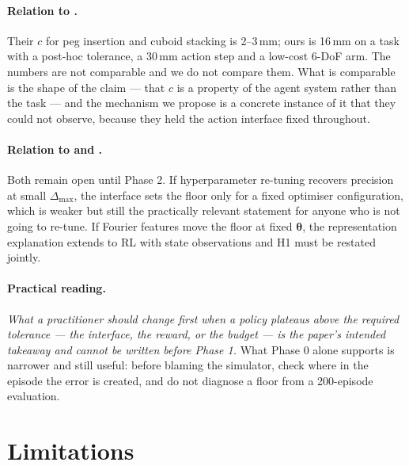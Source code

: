 \documentclass{article}
\newcommand{\planned}[1]{{\color{blue!70!black}\textit{#1}}}
\newcommand{\dmax}{\Delta_{\max}}
\newcommand{\iface}{\boldsymbol{\theta}}
\begin{document}
\paragraph{Relation to \citet{xu2026curse}.} Their $c$ for peg insertion and
cuboid stacking is 2--3\,mm; ours is 16\,mm on a task with a post-hoc tolerance,
a 30\,mm action step and a low-cost 6-DoF arm. The numbers are not comparable
and we do not compare them. What is comparable is the shape of the claim ---
that $c$ is a property of the agent system rather than the task --- and the
mechanism we propose is a concrete instance of it that they could not observe,
because they held the action interface fixed throughout.

\paragraph{Relation to \citet{bronars2026tune} and \citet{gyenes2026fourier}.}
Both remain open until Phase 2. If hyperparameter re-tuning recovers precision
at small $\dmax$, the interface sets the floor only for a fixed optimiser
configuration, which is weaker but still the practically relevant statement for
anyone who is not going to re-tune. If Fourier features move the floor at fixed
$\iface$, the representation explanation extends to RL with state observations
and H1 must be restated jointly.

\paragraph{Practical reading.} \planned{What a practitioner should change first
when a policy plateaus above the required tolerance --- the interface, the
reward, or the budget --- is the paper's intended takeaway and cannot be written
before Phase 1.} What Phase 0 alone supports is narrower and still useful:
before blaming the simulator, check where in the episode the error is created,
and do not diagnose a floor from a 200-episode evaluation.

\section{Limitations}
\label{sec:limitations}
\end{document}
